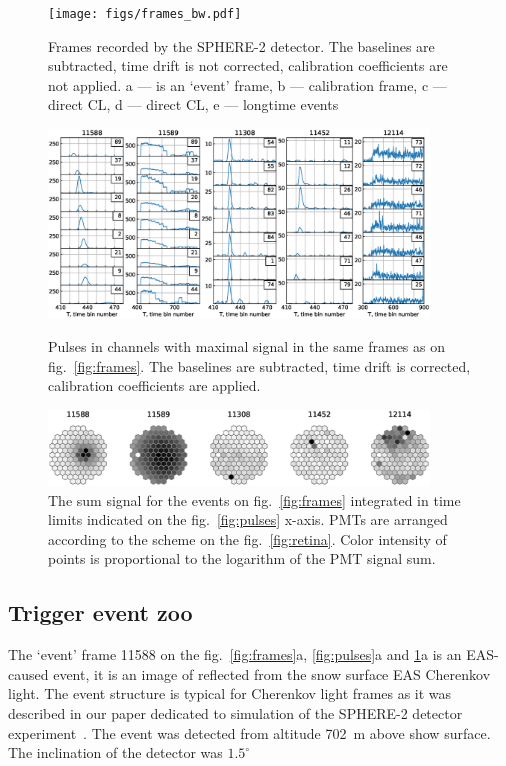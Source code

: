 \documentclass[final,5p,times,twocolumn]{elsarticle}
\begin{document}
\begin{figure}[btp]
\centering
\texttt{[image: figs/frames\_bw.pdf]}
\caption{Frames recorded by the SPHERE-2 detector. The baselines are subtracted, time drift is not corrected, calibration coefficients are not applied. a --- is an `event' frame, b --- calibration frame, c --- direct CL, d --- direct CL, e --- longtime events}
\label{fig:frames}

\includegraphics[width=0.9\textwidth]{figs/pulses.eps}%
\caption{Pulses in channels with maximal signal in the same frames as on fig.~\ref{fig:frames}. The baselines are subtracted, time drift is corrected, calibration coefficients are applied.}
\label{fig:pulses}
\vspace{1.2pc}
\includegraphics[width=0.9\textwidth]{figs/mosaic_sums_lin.eps}%
\vspace{-1.0pc}
\caption{The sum signal for the events on fig.~\ref{fig:frames} integrated in time limits indicated on the fig.~\ref{fig:pulses} x-axis. PMTs are arranged according to the scheme on the fig.~\ref{fig:retina}. Color intensity of points is proportional to the logarithm of the PMT signal sum.}
\label{fig:mosaic_sum}
\end{figure}

\subsection{Trigger event zoo}

The `event' frame 11588 on the fig.~\ref{fig:frames}a, \ref{fig:pulses}a and \ref{fig:mosaic_sum}a is an EAS-caused event, it is an image of reflected from the snow surface EAS Cherenkov light. The event structure is typical for Cherenkov light frames as it was described in our paper dedicated to simulation of the SPHERE-2 detector experiment~\cite{Ant19}. The event was detected from altitude 702~m above show surface. The inclination of the detector was $1.5^{\circ}$
\end{document}
